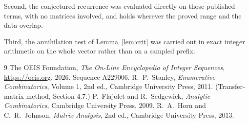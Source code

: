 \documentclass[11pt,a4paper]{article}
\theoremstyle{plain}
\theoremstyle{definition}
\begin{document}
Second, the conjectured recurrence was evaluated directly on those published terms, with no
matrices involved, and holds wherever the proved range and the data overlap.

Third, the annihilation test of Lemma~\ref{lem:crit} was carried out in exact integer
arithmetic on the whole vector rather than on a sampled prefix.

\begin{thebibliography}{9}
 The OEIS Foundation, \emph{The On-Line Encyclopedia of Integer
Sequences}, \url{https://oeis.org}, 2026. Sequence A229006.
 R.~P.~Stanley, \emph{Enumerative Combinatorics}, Volume 1, 2nd ed.,
Cambridge University Press, 2011. (Transfer-matrix method, Section 4.7.)
 P.~Flajolet and R.~Sedgewick, \emph{Analytic Combinatorics}, Cambridge
University Press, 2009.
 R.~A.~Horn and C.~R.~Johnson, \emph{Matrix Analysis}, 2nd ed., Cambridge
University Press, 2013.
\end{thebibliography}
\end{document}
